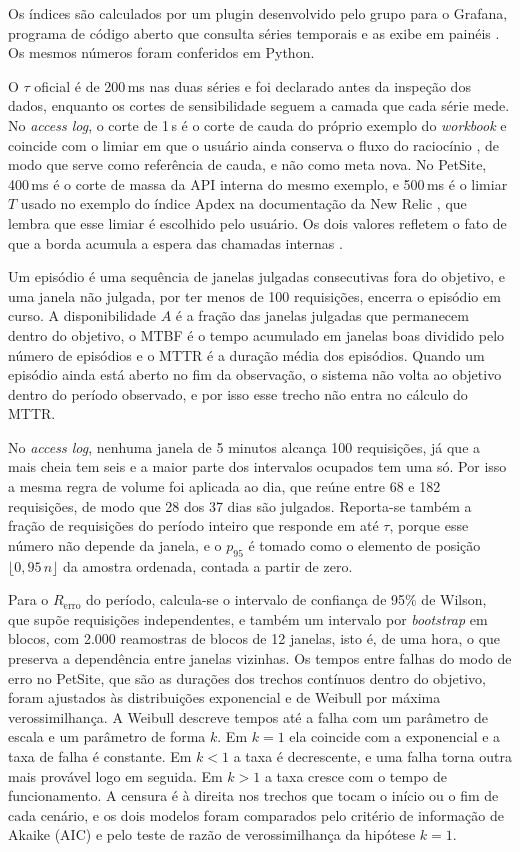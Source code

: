 \documentclass[12pt, a4paper, oneside]{article}
\begin{document}
Os índices são calculados por um plugin desenvolvido pelo grupo para o Grafana, programa de código aberto que consulta séries temporais e as exibe em painéis \cite{grafana}. Os mesmos números foram conferidos em Python.

O $\tau$ oficial é de 200\,ms nas duas séries e foi declarado antes da inspeção dos dados, enquanto os cortes de sensibilidade seguem a camada que cada série mede. No \textit{access log}, o corte de 1\,s é o corte de cauda do próprio exemplo do \textit{workbook} \cite{beyer2018workbook} e coincide com o limiar em que o usuário ainda conserva o fluxo do raciocínio \cite{nielsen1993response}, de modo que serve como referência de cauda, e não como meta nova. No PetSite, 400\,ms é o corte de massa da API interna do mesmo exemplo, e 500\,ms é o limiar $T$ usado no exemplo do índice Apdex \cite{apdex} na documentação da New Relic \cite{newrelic_apdex}, que lembra que esse limiar é escolhido pelo usuário. Os dois valores refletem o fato de que a borda acumula a espera das chamadas internas \cite{dean2013tail}.

Um episódio é uma sequência de janelas julgadas consecutivas fora do objetivo, e uma janela não julgada, por ter menos de 100 requisições, encerra o episódio em curso. A disponibilidade $A$ é a fração das janelas julgadas que permanecem dentro do objetivo, o MTBF é o tempo acumulado em janelas boas dividido pelo número de episódios e o MTTR é a duração média dos episódios. Quando um episódio ainda está aberto no fim da observação, o sistema não volta ao objetivo dentro do período observado, e por isso esse trecho não entra no cálculo do MTTR.

No \textit{access log}, nenhuma janela de 5 minutos alcança 100 requisições, já que a mais cheia tem seis e a maior parte dos intervalos ocupados tem uma só. Por isso a mesma regra de volume foi aplicada ao dia, que reúne entre 68 e 182 requisições, de modo que 28 dos 37 dias são julgados. Reporta-se também a fração de requisições do período inteiro que responde em até $\tau$, porque esse número não depende da janela, e o $p_{95}$ é tomado como o elemento de posição $\lfloor 0{,}95\,n \rfloor$ da amostra ordenada, contada a partir de zero.

Para o $R_{\mathrm{erro}}$ do período, calcula-se o intervalo de confiança de 95\% de Wilson, que supõe requisições independentes, e também um intervalo por \textit{bootstrap} em blocos, com 2.000 reamostras de blocos de 12 janelas, isto é, de uma hora, o que preserva a dependência entre janelas vizinhas. Os tempos entre falhas do modo de erro no PetSite, que são as durações dos trechos contínuos dentro do objetivo, foram ajustados às distribuições exponencial e de Weibull por máxima verossimilhança. A Weibull descreve tempos até a falha com um parâmetro de escala e um parâmetro de forma $k$. Em $k = 1$ ela coincide com a exponencial e a taxa de falha é constante. Em $k < 1$ a taxa é decrescente, e uma falha torna outra mais provável logo em seguida. Em $k > 1$ a taxa cresce com o tempo de funcionamento. A censura é à direita nos trechos que tocam o início ou o fim de cada cenário, e os dois modelos foram comparados pelo critério de informação de Akaike (AIC) e pelo teste de razão de verossimilhança da hipótese $k = 1$.
\end{document}

